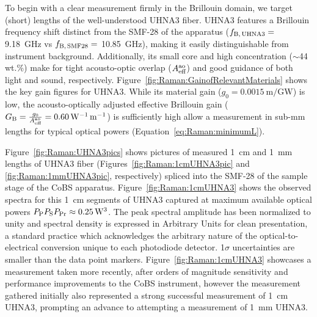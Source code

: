 To begin with a clear measurement firmly in the Brillouin domain, we target (short) lengths of the well-understood \ac{UHNA3} fiber. \cite{behunin2015long} \ac{UHNA3} features a Brillouin frequency shift distinct from the \ac{SMF-28} of the apparatus (\(f_{\rm B,\,UHNA3} =\) \SI{9.18}{\giga\hertz} vs \(f_{\rm B,\,SMF28} =\) \SI{10.85}{\giga\hertz}), making it easily distinguishable from instrument background. Additionally, its small core and high  concentration (\(\sim\)44 wt.\%) make for tight acousto-optic overlap (\(A_{\rm eff}^{\rm ao}\)) and good guidance of both light and sound, respectively. Figure~\ref{fig:Raman:GainofRelevantMaterials} shows the key gain figures for \ac{UHNA3}. While its material gain (\(g_{0} = \SI{0.0015}{\meter\per\giga\watt}\)) is low, the acousto-optically adjusted effective Brillouin gain (\(G_{\rm B} = \frac{g_{0}}{A_{\rm eff}^{\rm ao}} = \SI{0.60}{\per\watt\per\meter}\)) is sufficiently high allow a measurement in sub-\si{\milli\meter} lengths for typical optical powers (Equation~\ref{eq:Raman:minimumL}).

Figure~\ref{fig:Raman:UHNA3pics} shows pictures of measured \SI{1}{\centi\meter} and \SI{1}{\milli\meter} lengths of \ac{UHNA3} fiber (Figures~\ref{fig:Raman:1cmUHNA3pic} and \ref{fig:Raman:1mmUHNA3pic}, respectively) spliced into the \ac{SMF-28} of the sample stage of the \ac{CoBS} apparatus. Figure~\ref{fig:Raman:1cmUHNA3} shows the observed spectra for this \SI{1}{\centi\meter} segments of \ac{UHNA3} captured at maximum available optical powers \(P_{\rm P}P_{\rm S}P_{\rm Pr} \approx \SI{0.25}{\cubic\watt}\). The peak spectral amplitude has been normalized to unity and spectral density is expressed in Arbitrary Units for clean presentation, a standard practice which acknowledges the arbitrary nature of the optical-to-electrical conversion unique to each photodiode detector. 1\(\sigma\) uncertainties are smaller than the data point markers. Figure~\ref{fig:Raman:1cmUHNA3} showcases a measurement taken more recently, after orders of magnitude sensitivity and performance improvements to the \ac{CoBS} instrument, however the measurement gathered initially also represented a strong successful measurement of \SI{1}{\centi\meter} \ac{UHNA3}, prompting an advance to attempting a measurement of \SI{1}{\milli\meter} \ac{UHNA3}.

